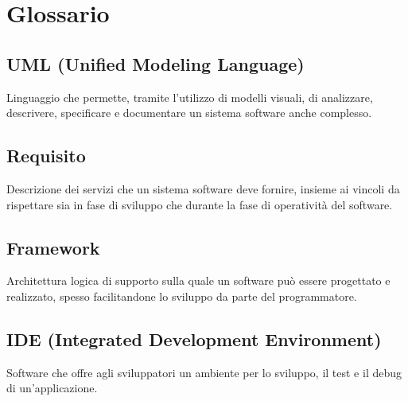 \cleardoublepage
\chapter{Glossario}

\nocite{*}

\section*{UML (Unified Modeling Language)}
\label{sec:uml-definition}
Linguaggio che permette, tramite l'utilizzo di modelli visuali, di analizzare, descrivere, specificare e documentare un sistema software anche complesso.

\section*{Requisito}
\label{sec:requisito-definition}
Descrizione dei servizi che un sistema software deve fornire, insieme ai vincoli da rispettare sia in fase di sviluppo che durante la fase di operatività del software.

\section*{Framework}
\label{sec:framework-definition}
Architettura logica di supporto sulla quale un software può essere progettato e realizzato, spesso facilitandone lo sviluppo da parte del programmatore.

\section*{IDE (Integrated Development Environment)}
\label{sec:ide-definition}
Software che offre agli sviluppatori un ambiente per lo sviluppo, il test e il debug di un'applicazione.